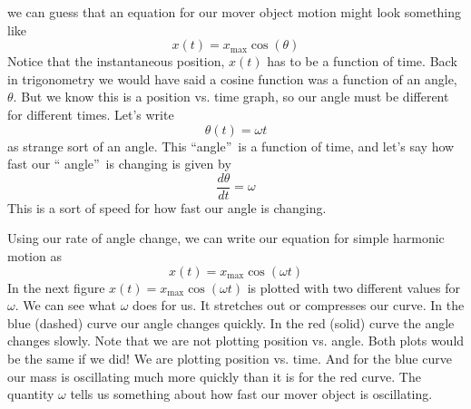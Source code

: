 \documentclass{book}
\begin{document}
we can guess that an equation for our mover object motion might look
something like%
\begin{equation*}
x\left( t\right) =x_{\max }\cos \left( \theta \right)
\end{equation*}%
Notice that the instantaneous position, $x\left( t\right) $ has to be a
function of time. Back in trigonometry we would have said a cosine function
was a function of an angle, $\theta .$ But we know this is a position vs.
time graph, so our angle must be different for different times. Let's write 
\begin{equation*}
\theta \left( t\right) =\omega t
\end{equation*}%
as strange sort of an angle. This \textquotedblleft angle\textquotedblright\
is a function of time, and let's say how fast our \textquotedblleft
angle\textquotedblright\ is changing is given by 
\begin{equation*}
\frac{d\theta }{dt}=\omega
\end{equation*}%
This is a sort of speed for how fast our angle is changing.

Using our rate of angle change, we can write our equation for simple
harmonic motion as 
\begin{equation*}
x\left( t\right) =x_{\max }\cos \left( \omega t\right)
\end{equation*}%
In the next figure $x\left( t\right) =x_{\max }\cos \left( \omega t\right) $
is plotted with two different values for $\omega .$ We can see what $\omega $ does
for us. It stretches out or compresses our curve. In the blue (dashed) curve
our angle changes quickly. In the red (solid) curve the angle changes
slowly. Note that we are not plotting position vs. angle. Both plots would
be the same if we did! We are plotting position vs. time. And for the blue
curve our mass is oscillating much more quickly than it is for the red
curve. The quantity $\omega $ tells us something about how fast our mover
object is oscillating.
\end{document}
